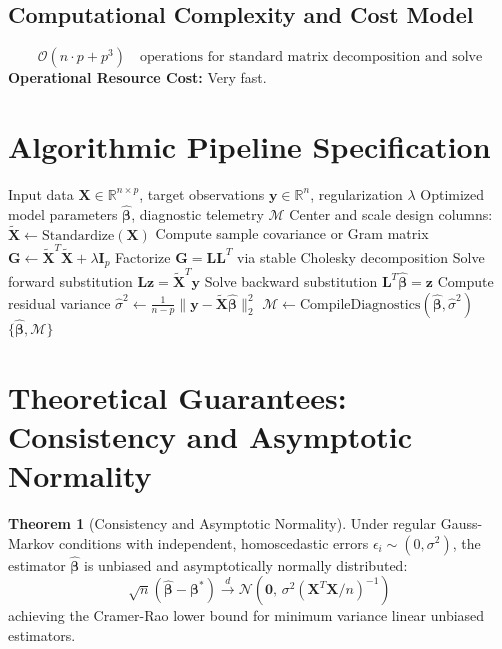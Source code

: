 \documentclass[11pt,a4paper]{article}
\theoremstyle{definition}
\newtheorem{theorem}{\textbf{Theorem}}[section]
\begin{document}
\subsection{Computational Complexity and Cost Model}
\begin{equation}
\mathcal{O}(n \cdot p + p^3) \quad \text{operations for standard matrix decomposition and solve}
\end{equation}
\textbf{Operational Resource Cost:} Very fast.

\section{Algorithmic Pipeline Specification}

\begin{algorithm}[H]
\caption{Intermittent demand forecasting Execution}
\begin{algorithmic}[1]
\Require Input data $\mathbf{X} \in \mathbb{R}^{n \times p}$, target observations $\mathbf{y} \in \mathbb{R}^n$, regularization $\lambda$
\Ensure Optimized model parameters $\hat{\boldsymbol{\beta}}$, diagnostic telemetry $\mathcal{M}$
\State Center and scale design columns: $\tilde{\mathbf{X}} \gets \text{Standardize}(\mathbf{X})$
\State Compute sample covariance or Gram matrix $\mathbf{G} \gets \tilde{\mathbf{X}}^T \tilde{\mathbf{X}} + \lambda \mathbf{I}_p$
\State Factorize $\mathbf{G} = \mathbf{L} \mathbf{L}^T$ via stable Cholesky decomposition
\State Solve forward substitution $\mathbf{L} \mathbf{z} = \tilde{\mathbf{X}}^T \mathbf{y}$
\State Solve backward substitution $\mathbf{L}^T \hat{\boldsymbol{\beta}} = \mathbf{z}$
\State Compute residual variance $\hat{\sigma}^2 \gets \frac{1}{n - p} \| \mathbf{y} - \tilde{\mathbf{X}} \hat{\boldsymbol{\beta}} \|_2^2$
\State $\mathcal{M} \gets \text{CompileDiagnostics}(\hat{\boldsymbol{\beta}}, \hat{\sigma}^2)$
\State \Return $\{\hat{\boldsymbol{\beta}}, \mathcal{M}\}$
\end{algorithmic}
\end{algorithm}

\section{Theoretical Guarantees: Consistency and Asymptotic Normality}

\begin{theorem}[Consistency and Asymptotic Normality]
Under regular Gauss-Markov conditions with independent, homoscedastic errors $\epsilon_i \sim (0, \sigma^2)$, the estimator $\hat{\boldsymbol{\beta}}$ is unbiased and asymptotically normally distributed:
\begin{equation}
\sqrt{n}(\hat{\boldsymbol{\beta}} - \boldsymbol{\beta}^*) \xrightarrow{d} \mathcal{N}\left(\mathbf{0}, \, \sigma^2 (\mathbf{X}^T \mathbf{X} / n)^{-1}\right)
\end{equation}
achieving the Cramer-Rao lower bound for minimum variance linear unbiased estimators.
\end{theorem}
\end{document}
